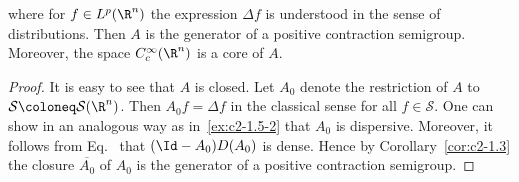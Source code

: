 \begin{examples}
\begin{enumerate}[\upshape (i), wide, labelindent=.25em]
\[\]
where for $f \in L^{p}(\R^{n})$ the expression $\Delta f$ is understood in the sense of distributions. Then $A$ is the generator of a positive contraction semigroup. Moreover, the space $C_{c}^{\infty}(\R^{n})$ is a core of\/ $A$.
\begin{proof}
It is easy to see that $A$ is closed. 
Let $A_{0}$ denote the restriction of\/ $A$ to $\mathcal{S} \coloneq \mathcal{S}(\R^{n})$. 
Then $A_{0}f = \Delta f$ in the classical sense for all $f \in \mathcal{S}$.
One can show in an analogous way as in~\ref{ex:c2-1.5-2}   that $A_{0}$ is dispersive. 
Moreover, it follows from Eq.~ that $(\Id - A_{0})D(A_{0})$ is dense. 
Hence by Corollary~\ref{cor:c2-1.3}   the closure $\overline{A_{0}}$ of\/ $A_{0}$ is the generator of a positive contraction semigroup.


\end{proof}
\end{enumerate}
\end{examples}
